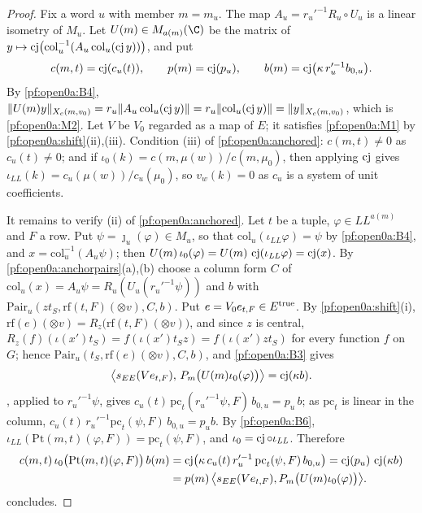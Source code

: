 \begin{proof}
Fix a word $u$ with member $m=m_u$. The map $A_u=r_u'^{-1}R_u\circ U_u$ is a linear isometry of $M_u$. Let
$U(m)\in M_{a(m)}(\C)$ be the matrix of $y\mapsto\operatorname{cj}\bigl(\mathrm{col}_u^{-1}(A_u\,\mathrm{col}_u(\operatorname{cj}
y))\bigr)$, and put
\[
c(m,t)=\operatorname{cj}(c_u(t)),\qquad p(m)=\operatorname{cj}(p_u),\qquad b(m)=\operatorname{cj}\bigl(\kappa\,r_u'^{-1}b_{0,u}\bigr).
\]
By \ref{pf:open0a:B4}, $\|U(m)y\|_{X_c(m,v_0)}=r_u\|A_u\,\mathrm{col}_u(\operatorname{cj} y)\|=r_u\|\mathrm{col}_u(\operatorname{cj}
y)\|=\|y\|_{X_c(m,v_0)}$, which is \ref{pf:open0a:M2}. Let $V$ be $V_0$ regarded as a map of $E$; it satisfies
\ref{pf:open0a:M1} by \cref{pf:open0a:shift}(ii),(iii). Condition (iii) of \cref{pf:open0a:anchored}: $c(m,t)\ne0$ as
$c_u(t)\ne0$; and if $\iota_0(k)=c(m,\mu(w))/c(m,\mu_0)$, then applying $\operatorname{cj}$ gives
$\iota_{\mathit{LL}}(k)=c_u(\mu(w))/c_u(\mu_0)$, so $v_w(k)=0$ as $c_u$ is a system of unit coefficients.

It remains to verify (ii) of \cref{pf:open0a:anchored}. Let $t$ be a tuple, $\varphi\in\mathit{LL}^{a(m)}$ and $F$ a row.
Put $\psi=\jmath_u(\varphi)\in M_u$, so that $\mathrm{col}_u(\iota_{\mathit{LL}}\varphi)=\psi$ by \ref{pf:open0a:B4}, and
$x=\mathrm{col}_u^{-1}(A_u\psi)$; then $U(m)\,\iota_0(\varphi)=U(m)\,\operatorname{cj}(\iota_{\mathit{LL}}\varphi)
=\operatorname{cj}(x)$. By \cref{pf:open0a:anchorpairs}(a),(b) choose a column form $C$ of
$\mathrm{col}_u(x)=A_u\psi=R_u(U_u(r_u'^{-1}\psi))$ and $b$ with $\mathrm{Pair}_u(zt_S,\mathrm{rf}(t,F)(\otimes v),C,b)$.
Put $e=V_0e_{t,F}\in E^{\mathrm{true}}$. By \cref{pf:open0a:shift}(i), $\mathrm{rf}(e)(\otimes
v)=R_z\bigl(\mathrm{rf}(t,F)(\otimes v)\bigr)$, and since $z$ is central, $R_z(f)(\iota(x')t_S)=f(\iota(x')t_Sz)
=f(\iota(x')zt_S)$ for every function $f$ on $G$; hence $\mathrm{Pair}_u(t_S,\mathrm{rf}(e)(\otimes v),C,b)$, and
\ref{pf:open0a:B3} gives
\[
\bigl\langle s_{EE}(Ve_{t,F}),\,P_m\bigl(U(m)\iota_0(\varphi)\bigr)\bigr\rangle=\operatorname{cj}(\kappa b).
\]
, applied to $r_u'^{-1}\psi$, gives
$c_u(t)\,\mathrm{pc}_t(r_u'^{-1}\psi,F)\,b_{0,u}=p_u\,b$; as $\mathrm{pc}_t$ is linear in the column,
$c_u(t)\,r_u'^{-1}\mathrm{pc}_t(\psi,F)\,b_{0,u}=p_ub$. By \ref{pf:open0a:B6},
$\iota_{\mathit{LL}}(\mathrm{Pt}(m,t)(\varphi,F))=\mathrm{pc}_t(\psi,F)$, and $\iota_0=\operatorname{cj}\circ\iota_{\mathit{LL}}$.
Therefore
\begin{align*}
c(m,t)\,\iota_0\bigl(\mathrm{Pt}(m,t)(\varphi,F)\bigr)\,b(m)
&=\operatorname{cj}\bigl(\kappa\,c_u(t)\,r_u'^{-1}\,\mathrm{pc}_t(\psi,F)\,b_{0,u}\bigr)
=\operatorname{cj}(p_u)\,\operatorname{cj}(\kappa b)\\
&=p(m)\,\bigl\langle s_{EE}(Ve_{t,F}),P_m\bigl(U(m)\iota_0(\varphi)\bigr)\bigr\rangle .
\end{align*}
 concludes.
\end{proof}

